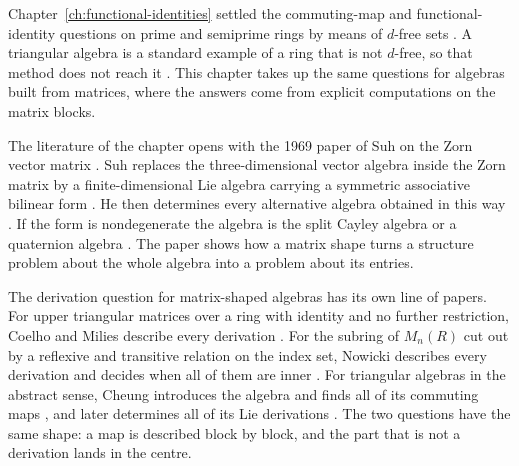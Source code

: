 Chapter~\ref{ch:functional-identities} settled the commuting-map and
functional-identity questions on prime and semiprime rings by means of
$d$-free sets \cite[p.~21]{BresarMartindaleChebotar2007FI}. A triangular
algebra is a standard example of a ring that is not $d$-free, so that method
does not reach it \cite[Section~1]{Benkovic2014}. This chapter takes up the
same questions for algebras built from matrices, where the answers come from
explicit computations on the matrix blocks.

The literature of the chapter opens with the 1969 paper of Suh on the Zorn vector
matrix \cite[p.~255]{Suh1969}. Suh replaces the three-dimensional vector
algebra inside the Zorn matrix by a finite-dimensional Lie algebra carrying a
symmetric associative bilinear form \cite[p.~255]{Suh1969}. He then determines
every alternative algebra obtained in this way \cite[p.~255]{Suh1969}. If the
form is nondegenerate the algebra is the split Cayley algebra or a quaternion
algebra \cite[Theorem~1, p.~257]{Suh1969}. The paper shows how a matrix shape
turns a structure problem about the whole algebra into a problem about its
entries.

The derivation question for matrix-shaped algebras has its own line of papers.
For upper triangular matrices over a ring with identity and no further
restriction, Coelho and Milies describe every derivation
\cite[p.~263]{CoelhoMilies1993}. For the subring of $M_n(R)$ cut out by a
reflexive and transitive relation on the index set, Nowicki describes every
derivation and decides when all of them are inner
\cite[Theorem~3.7, p.~287]{Nowicki1983}. For triangular algebras in the abstract
sense, Cheung introduces the algebra and finds all of its commuting maps
\cite[p.~119]{Cheung2001}, and later determines all of its Lie derivations
\cite[Theorem~11, p.~307]{Cheung2003}. The two questions have the same shape: a
map is described block by block, and the part that is not a derivation lands in
the centre.

